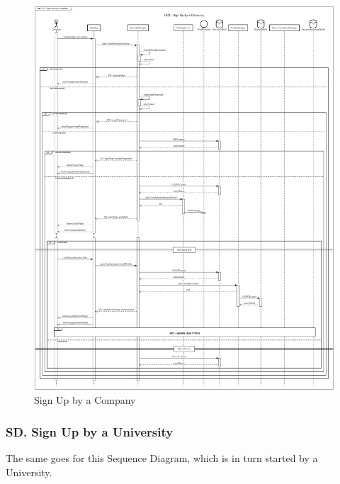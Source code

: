 \begin{figure}[H]
    \begin{center}
         \includegraphics[width=0.9\linewidth]{LaTeXCode/images/SequenceDiagrams/UC2-sequenceDiagram.png}
         \caption{Sign Up by a Company}
         \label{fig:signup_company_sd}
     \end{center}
\end{figure}

\subsubsection*{SD\cuc. Sign Up by a University}
\label{subsubsec:signup_university_sd}
The same goes for this Sequence Diagram, which is in turn started by a University.

